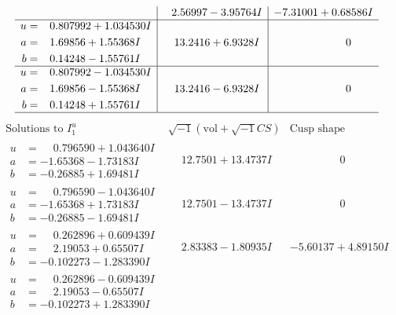 \documentclass[1p]{elsarticle_modified}
\theoremstyle{definition}
\newcommand{\I}{\sqrt{-1}}
\begin{document}
$$\begin{array}{c|c|c}
 & \phantom{-}2.56997 - 3.95764 I & -7.31001 + 0.68586 I \\ \hline\begin{aligned}
u &= \phantom{-}0.807992 + 1.034530 I \\
a &= \phantom{-}1.69856 + 1.55368 I \\
b &= \phantom{-}0.14248 - 1.55761 I\end{aligned}
 & \phantom{-}13.2416 + 6.9328 I & \phantom{-0.000000 } 0 \\ \hline\begin{aligned}
u &= \phantom{-}0.807992 - 1.034530 I \\
a &= \phantom{-}1.69856 - 1.55368 I \\
b &= \phantom{-}0.14248 + 1.55761 I\end{aligned}
 & \phantom{-}13.2416 - 6.9328 I & \phantom{-0.000000 } 0\\
 \hline 
 \end{array}$$\newpage$$\begin{array}{c|c|c}  
\text{Solutions to }I^u_{1}& \I (\text{vol} + \sqrt{-1}CS) & \text{Cusp shape}\\
 \hline 
\begin{aligned}
u &= \phantom{-}0.796590 + 1.043640 I \\
a &= -1.65368 - 1.73183 I \\
b &= -0.26885 + 1.69481 I\end{aligned}
 & \phantom{-}12.7501 + 13.4737 I & \phantom{-0.000000 } 0 \\ \hline\begin{aligned}
u &= \phantom{-}0.796590 - 1.043640 I \\
a &= -1.65368 + 1.73183 I \\
b &= -0.26885 - 1.69481 I\end{aligned}
 & \phantom{-}12.7501 - 13.4737 I & \phantom{-0.000000 } 0 \\ \hline\begin{aligned}
u &= \phantom{-}0.262896 + 0.609439 I \\
a &= \phantom{-}2.19053 + 0.65507 I \\
b &= -0.102273 - 1.283390 I\end{aligned}
 & \phantom{-}2.83383 - 1.80935 I & -5.60137 + 4.89150 I \\ \hline\begin{aligned}
u &= \phantom{-}0.262896 - 0.609439 I \\
a &= \phantom{-}2.19053 - 0.65507 I \\
b &= -0.102273 + 1.283390 I\end{aligned}

\end{array}$$
\end{document}
